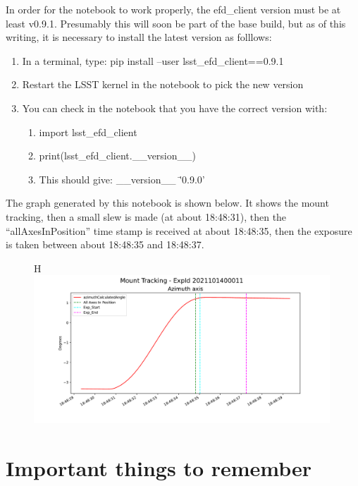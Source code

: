 \documentclass[SE,authoryear,toc]{lsstdoc}
\begin{document}
In order for the notebook to work properly, the efd\_client version must be at least v0.9.1.  Presumably this will soon be part of the base build, but as of this writing, it is necessary to install the latest version as folllows:
\begin{enumerate}
  \item In a terminal, type: pip install --user lsst\_efd\_client==0.9.1
  \item Restart the LSST kernel in the notebook to pick the new version
  \item You can check in the notebook that you have the correct version with:
    \begin{enumerate}
    \item import lsst\_efd\_client
    \item print(lsst\_efd\_client.\_\_version\_\_)
      \item This should give: \_\_version\_\_ \= '0.9.0'
    \end{enumerate}
\end{enumerate}


The graph generated by this notebook is shown below.  It shows the mount tracking, then a small slew is made (at about 18:48:31), then the ``allAxesInPosition'' time stamp is received at about 18:48:35, then the exposure is taken between about 18:48:35 and 18:48:37.

  \begin {figure} {H}
    \centering
    \includegraphics[trim=0.0in 0.0in 0.0in 0.0in,clip,width=0.99\textwidth]{Tracking_Timebase_2021101400011_29Oct21.pdf}
  \end{figure}

\section{Important things to remember}
\end{document}
